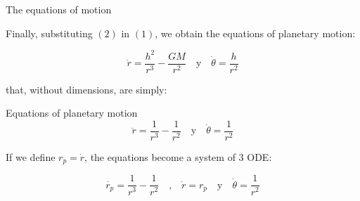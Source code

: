 \documentclass[hyperref={pdfpagelabels=false}]{beamer}
\begin{document}
\begin{frame}{The equations of motion}

Finally, substituting $(2)$ in $(1)$, we obtain the equations of planetary motion:

\begin{equation}
\ddot{r}=\frac{h^2}{r^3} - \frac{GM}{r^2} \quad \text{y} \quad \dot{\theta}=\frac{h}{r^2}
\end{equation}

that, without dimensions, are simply:
\begin{block}{Equations of planetary motion}
\begin{equation}
\ddot{r} = \frac{1}{r^3}-\frac{1}{r^2} \quad \text{y} \quad \dot{\theta}= \frac{1}{r^2}
\end{equation}
\end{block}
\vspace{10pt}

If we define $r_{p}=\dot{r}$, the equations become a system of 3 ODE:

\begin{equation}
  \dot{r_{p}} =\frac{1}{r^3}-\frac{1}{r^2} \quad \text{,} \quad 
  \dot{r} = r_{p} \quad \text{y} \quad 
  \dot{\theta} = \frac{1}{r^2}
\end{equation}
\end{frame}
\end{document}
